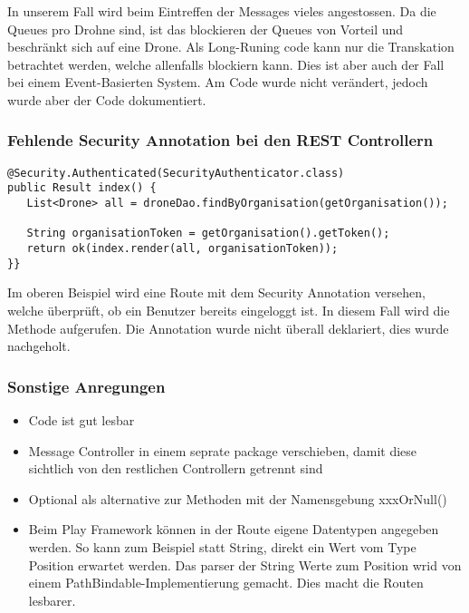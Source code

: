 In unserem Fall wird beim Eintreffen der Messages vieles angestossen. Da die Queues pro Drohne sind, ist das blockieren der Queues von Vorteil und beschränkt sich auf eine Drone. Als Long-Runing code kann nur die Transkation betrachtet werden, welche allenfalls blockiern kann. Dies ist aber auch der Fall bei einem Event-Basierten System. Am Code wurde nicht verändert, jedoch wurde aber der Code dokumentiert.

\subsubsection{Fehlende Security Annotation bei den REST Controllern}
\begin{lstlisting}
@Security.Authenticated(SecurityAuthenticator.class)
public Result index() {
   List<Drone> all = droneDao.findByOrganisation(getOrganisation());
   
   String organisationToken = getOrganisation().getToken();
   return ok(index.render(all, organisationToken));
}}
\end{lstlisting}

Im oberen Beispiel wird eine Route mit dem Security Annotation versehen, welche überprüft, ob ein Benutzer bereits eingeloggt ist. In diesem Fall wird die Methode aufgerufen. Die Annotation wurde nicht überall deklariert, dies wurde nachgeholt.


\subsubsection{Sonstige Anregungen}
\begin{itemize}
	\item{Code ist gut lesbar}
	\item{Message Controller in einem seprate package verschieben, damit diese sichtlich von den restlichen Controllern getrennt sind}
	\item{Optional als alternative zur Methoden mit der Namensgebung xxxOrNull()}
	\item{
	Beim Play Framework können in der Route eigene Datentypen angegeben werden.
	So kann zum Beispiel statt String, direkt ein Wert vom Type Position erwartet werden.
	Das parser der String Werte zum Position wrid von einem PathBindable-Implementierung gemacht.
	Dies macht die Routen lesbarer. }
\end{itemize}
